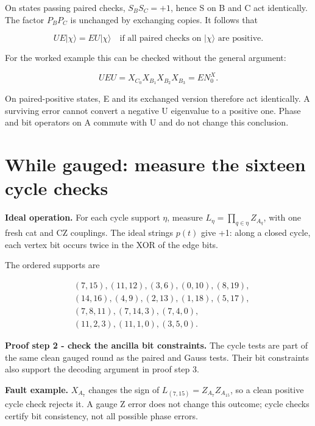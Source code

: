 \documentclass[11pt]{article}
\begin{document}
On states passing paired checks, \(S_BS_C=+1\), hence S on B and C act identically. The factor \(P_BP_C\) is unchanged by exchanging copies. It follows that

\[
UE|\chi\rangle=EU|\chi\rangle
\quad\text{if all paired checks on }|\chi\rangle\text{ are positive}.
\]

For the worked example this can be checked without the general argument:

\[
UEU=X_{C_0}X_{B_1}X_{B_2}X_{B_3}=E N_0^X.
\]

On paired-positive states, E and its exchanged version therefore act identically. A surviving error cannot convert a negative U eigenvalue to a positive one. Phase and bit operators on A commute with U and do not change this conclusion.

\section{While gauged: measure the sixteen cycle checks}
\textbf{Ideal operation.} For each cycle support \(\eta\), measure \(L_\eta=\prod_{q\in\eta}Z_{A_q}\), with one fresh cat and CZ couplings. The ideal strings \(p(t)\) give +1: along a closed cycle, each vertex bit occurs twice in the XOR of the edge bits.

\begin{center}\begin{minipage}{\linewidth}

\end{minipage}\end{center}

The ordered supports are

\[
\begin{aligned}
&(7,15),(11,12),(3,6),(0,10),(8,19),\\
&(14,16),(4,9),(2,13),(1,18),(5,17),\\
&(7,8,11),(7,14,3),(7,4,0),\\
&(11,2,3),(11,1,0),(3,5,0).
\end{aligned}
\]

\textbf{Proof step 2 - check the ancilla bit constraints.} The cycle tests are part of the same clean gauged round as the paired and Gauss tests. Their bit constraints also support the decoding argument in proof step 3.

\textbf{Fault example.} \(X_{A_7}\) changes the sign of \(L_{(7,15)}=Z_{A_7}Z_{A_{15}}\), so a clean positive cycle check rejects it. A gauge Z error does not change this outcome; cycle checks certify bit consistency, not all possible phase errors.
\end{document}
